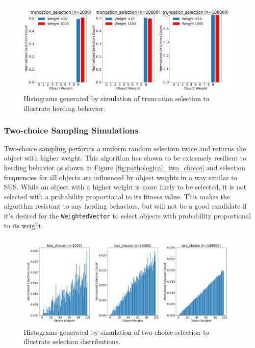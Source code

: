 \documentclass[12pt]{article}
\begin{document}
    \begin{figure}[htbp]
      \centering
      \includegraphics[scale=0.32]{images/pathological_truncation.png} 
      \caption{Histograms generated by simulation of truncation selection
               to illustrate herding behavior.}
      \label{fig:pathological_truncation}
    \end{figure}

    \subsubsection{Two-choice Sampling Simulations}
    Two-choice sampling \cite{azar1994} \cite{2choice} performs a uniform
    random selection twice and returns the object with higher weight. This
    algorithm has shown to be extremely resilient to herding behavior as shown
    in Figure \ref{fig:pathological_two_choice} and selection frequencies for
    all objects are influenced by object weights in a way similar to SUS. While
    an object with a higher weight is more likely to be selected, it is not
    selected with a probability proportional to its fitness value. This makes
    the algorithm resistant to any herding behaviors, but will not be a good
    candidate if it's desired for the \texttt{WeightedVector} to select objects
    with probability proportional to its weight.

    \begin{figure}[htbp]
      \centering
      \includegraphics[scale=0.32]{images/herding_two_choice.png} 
      \caption{Histograms generated by simulation of two-choice selection
               to illustrate selection distributions.}
      \label{fig:herding_two_choice}
    \end{figure}
\end{document}
